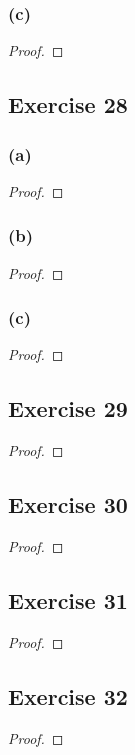 \documentclass[14pt]{extarticle}
\begin{document}
\subsubsection{(c)}

\begin{proof}

\end{proof}

\subsection{Exercise 28}

\subsubsection{(a)}

\begin{proof}

\end{proof}

\subsubsection{(b)}

\begin{proof}

\end{proof}

\subsubsection{(c)}

\begin{proof}

\end{proof}

\subsection{Exercise 29}

\begin{proof}

\end{proof}

\subsection{Exercise 30}

\begin{proof}

\end{proof}

\subsection{Exercise 31}

\begin{proof}

\end{proof}

\subsection{Exercise 32}

\begin{proof}

\end{proof}
\end{document}
